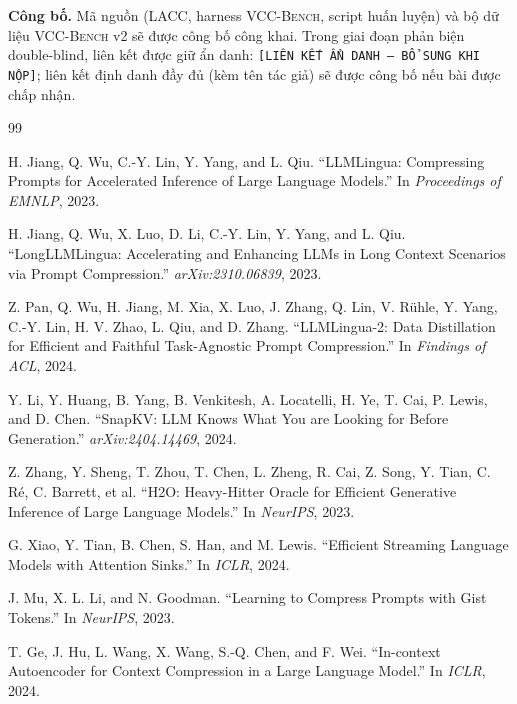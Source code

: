 \documentclass[12pt,a4paper]{article}
\newcommand{\method}[1]{\textsc{#1}}         %
\begin{document}
\textbf{Công bố.} Mã nguồn (\method{LACC}, harness \method{VCC-Bench}, script huấn luyện) và bộ dữ liệu \method{VCC-Bench} v2 sẽ được công bố công khai. Trong giai đoạn phản biện double-blind, liên kết được giữ ẩn danh: \texttt{[LIÊN KẾT ẨN DANH -- BỔ SUNG KHI NỘP]}; liên kết định danh đầy đủ (kèm tên tác giả) sẽ được công bố nếu bài được chấp nhận.



\begin{thebibliography}{99}

H. Jiang, Q. Wu, C.-Y. Lin, Y. Yang, and L. Qiu.
\newblock ``LLMLingua: Compressing Prompts for Accelerated Inference of Large Language Models.''
\newblock In \emph{Proceedings of EMNLP}, 2023.

H. Jiang, Q. Wu, X. Luo, D. Li, C.-Y. Lin, Y. Yang, and L. Qiu.
\newblock ``LongLLMLingua: Accelerating and Enhancing LLMs in Long Context Scenarios via Prompt Compression.''
\newblock \emph{arXiv:2310.06839}, 2023.

Z. Pan, Q. Wu, H. Jiang, M. Xia, X. Luo, J. Zhang, Q. Lin, V. Rühle, Y. Yang, C.-Y. Lin, H. V. Zhao, L. Qiu, and D. Zhang.
\newblock ``LLMLingua-2: Data Distillation for Efficient and Faithful Task-Agnostic Prompt Compression.''
\newblock In \emph{Findings of ACL}, 2024.

Y. Li, Y. Huang, B. Yang, B. Venkitesh, A. Locatelli, H. Ye, T. Cai, P. Lewis, and D. Chen.
\newblock ``SnapKV: LLM Knows What You are Looking for Before Generation.''
\newblock \emph{arXiv:2404.14469}, 2024.

Z. Zhang, Y. Sheng, T. Zhou, T. Chen, L. Zheng, R. Cai, Z. Song, Y. Tian, C. Ré, C. Barrett, et al.
\newblock ``H2O: Heavy-Hitter Oracle for Efficient Generative Inference of Large Language Models.''
\newblock In \emph{NeurIPS}, 2023.

G. Xiao, Y. Tian, B. Chen, S. Han, and M. Lewis.
\newblock ``Efficient Streaming Language Models with Attention Sinks.''
\newblock In \emph{ICLR}, 2024.

J. Mu, X. L. Li, and N. Goodman.
\newblock ``Learning to Compress Prompts with Gist Tokens.''
\newblock In \emph{NeurIPS}, 2023.

T. Ge, J. Hu, L. Wang, X. Wang, S.-Q. Chen, and F. Wei.
\newblock ``In-context Autoencoder for Context Compression in a Large Language Model.''
\newblock In \emph{ICLR}, 2024.


\end{thebibliography}
\end{document}
